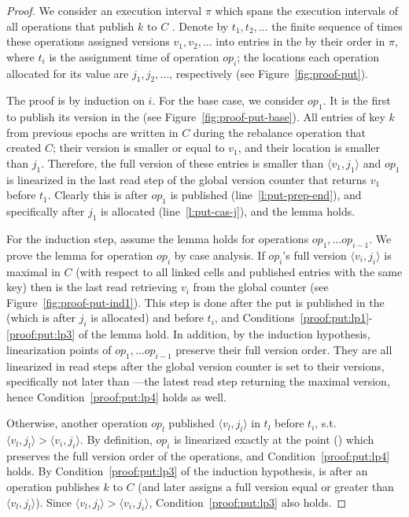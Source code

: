 \begin{proof}
We consider an execution interval $\pi$ which spans the execution intervals of all operations that publish $k$ to $C$ .
Denote by $t_1, t_2, \ldots $ the finite sequence of times these operations assigned versions $v_1, v_2, \ldots$ into entries in the  by their order in $\pi$, where $t_i$ is the assignment time of operation $op_i$; the locations each operation allocated for its value are $j_1, j_2, \ldots$, respectively (see Figure~\ref{fig:proof-put}).

The proof is by induction on $i$. For the base case, we consider $op_1$. It is the first to publish its version in the   (see Figure~\ref{fig:proof-put-base}). 
All entries of key $k$ from previous epochs are written in $C$ during the rebalance operation that created $C$; their version is smaller or equal to $v_1$, and their location is smaller than $j_1$. 
Therefore, the full version of these entries is smaller than $\langle v_1, j_1\rangle$  and $op_1$ is linearized in the last read step of the global version counter that returns $v_1$ before $t_1$. Clearly this is after $op_1$ is published (line~\ref{l:put-prep-end}), and specifically after $j_1$ is allocated (line~\ref{l:put-cas-j}), and the lemma holds.

For the induction step, assume the lemma holds for operations $op_1, \ldots op_{i-1}$. We prove the lemma for operation $op_i$ by case analysis.
If $op_i$'s full version $\langle v_i, j_i\rangle$ is maximal in $C$ (with respect to all linked cells and published entries with the same key) then  is the last read retrieving $v_i$ from the global counter  (see Figure~\ref{fig:proof-put-ind1}). This step is done after the put is published in the  (which is after $j_i$ is allocated) and before $t_i$, and Conditions~\ref{proof:put:lp1}-\ref{proof:put:lp3} of the lemma hold. In addition, by the induction hypothesis, linearization points of $op_1, \ldots op_{i-1}$ preserve their full version order. They are all linearized in read steps after the global version counter is set to their versions, specifically not later than ---the latest read step returning the maximal version, hence Condition~\ref{proof:put:lp4} holds as well.

Otherwise, another operation $op_l$ published $\langle v_l, j_l\rangle$ in $t_l$ before $t_i$, s.t. $\langle v_l, j_l\rangle > \langle v_i, j_i\rangle$. By definition, $op_i$ is linearized exactly at the point () which preserves the full version order of the operations, and Condition~\ref{proof:put:lp4} holds. By Condition~\ref{proof:put:lp3} of the induction hypothesis,  is after an operation publishes $k$ to $C$ (and later assigns a full version equal or greater than $\langle v_l, j_l\rangle$). Since $\langle v_l, j_l\rangle > \langle v_i, j_i\rangle$, Condition~\ref{proof:put:lp3} also holds. 


\end{proof}
